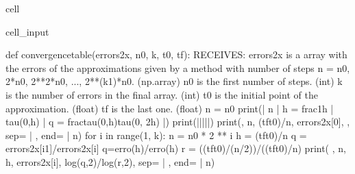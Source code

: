 \documentclass[letterpaper,10pt,english]{jupyterBook}
\begin{document}
\begin{sphinxuseclass}{cell}
\begin{sphinxVerbatimInput}
\begin{sphinxuseclass}{cell_input}
\begin{sphinxVerbatim}[commandchars=\\\{\}]
def convergence\PYGZus{}table(errors\PYGZus{}2x, n0, k, t0, tf):
  \PYGZsq{}\PYGZsq{}\PYGZsq{}
  RECEIVES:
  errors\PYGZus{}2x is a array with the errors of the approximations given
  by a method with number of steps n = n0, 2*n0, 2**2*n0, ..., 2**(k\PYGZhy{}1)*n0. (np.array)
  n0 is the first number of steps. (int)
  k is the number of errors in the final array. (int)
  t0 is the initial point of the approximation. (float)
  tf is the last one. (float)
  \PYGZsq{}\PYGZsq{}\PYGZsq{}
  n = n0
  print(\PYGZdq{}| n | h = \PYGZdl{}\PYGZbs{}\PYGZbs{}frac\PYGZob{}1\PYGZcb{}\PYGZob{}h\PYGZcb{}\PYGZdl{} | \PYGZdl{}\PYGZbs{}\PYGZbs{}tau(0,h)\PYGZdl{} | q = \PYGZdl{}\PYGZbs{}\PYGZbs{}frac\PYGZob{}tau(0,h)\PYGZcb{}\PYGZob{}tau(0, 2h)\PYGZcb{}\PYGZdl{} |\PYGZdq{})
  print(\PYGZdq{}|\PYGZhy{}\PYGZhy{}\PYGZhy{}|\PYGZhy{}\PYGZhy{}\PYGZhy{}\PYGZhy{}\PYGZhy{}\PYGZhy{}\PYGZhy{}\PYGZhy{}\PYGZhy{}\PYGZhy{}\PYGZhy{}\PYGZhy{}\PYGZhy{}\PYGZhy{}\PYGZhy{}\PYGZhy{}\PYGZhy{}|\PYGZhy{}\PYGZhy{}\PYGZhy{}\PYGZhy{}\PYGZhy{}\PYGZhy{}\PYGZhy{}\PYGZhy{}\PYGZhy{}\PYGZhy{}\PYGZhy{}|\PYGZhy{}\PYGZhy{}\PYGZhy{}\PYGZhy{}\PYGZhy{}\PYGZhy{}\PYGZhy{}\PYGZhy{}\PYGZhy{}\PYGZhy{}\PYGZhy{}\PYGZhy{}\PYGZhy{}\PYGZhy{}\PYGZhy{}\PYGZhy{}\PYGZhy{}\PYGZhy{}\PYGZhy{}\PYGZhy{}\PYGZhy{}\PYGZhy{}\PYGZhy{}\PYGZhy{}\PYGZhy{}\PYGZhy{}\PYGZhy{}\PYGZhy{}\PYGZhy{}\PYGZhy{}\PYGZhy{}\PYGZhy{}\PYGZhy{}|\PYGZdq{})
  print(\PYGZdq{}\PYGZdq{}, n, (tf\PYGZhy{}t0)/n, errors\PYGZus{}2x[0], \PYGZdq{}\PYGZhy{}\PYGZdq{}, sep=\PYGZdq{} | \PYGZdq{}, end=\PYGZdq{} | \PYGZbs{}n\PYGZdq{})
  for i in range(1, k):
      n = n0 * 2 ** i
      h = (tf\PYGZhy{}t0)/n
      q = errors\PYGZus{}2x[i\PYGZhy{}1]/errors\PYGZus{}2x[i] \PYGZsh{}q=erro(h)/erro(h)
      r = ((tf\PYGZhy{}t0)/(n/2))/((tf\PYGZhy{}t0)/n)
      print( \PYGZdq{}\PYGZdq{}, n, h, errors\PYGZus{}2x[i], log(q,2)/log(r,2), sep=\PYGZdq{} | \PYGZdq{}, end=\PYGZdq{} | \PYGZbs{}n\PYGZdq{})


\end{sphinxVerbatim}
\end{sphinxuseclass}
\end{sphinxVerbatimInput}
\end{sphinxuseclass}
\end{document}
